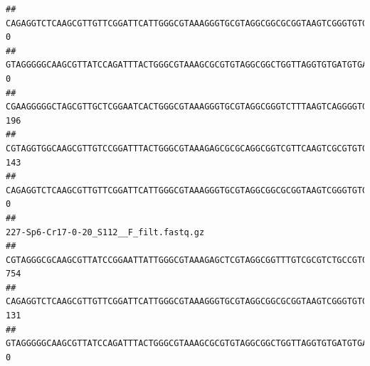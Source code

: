 \documentclass[]{article}
\begin{document}
\begin{verbatim}
## CAGAGGTCTCAAGCGTTGTTCGGATTCATTGGGCGTAAAGGGTGCGTAGGCGGCGCGGTAAGTCGGGTGTGAAATCTCGGAGCTTAACTCCGAAACTGCATTCGATACTGCCGTGCTTGAGGACTGGAGAGGAGACTGGAATTTACGGTGTAGCGGTGAAATGCGTAGATATCGTAAGGAAGACCAGTGGCGAAGGCGGGTCTCTGGACAGTTCCTGACGCTGAGGCACGAAGGCCAGGGGAGCAAACG                                       0
## GTAGGGGGCAAGCGTTATCCAGATTTACTGGGCGTAAAGCGCGTGTAGGCGGCTGGTTAGGTGTGATGTGAAATCTTCCGGCTCAACCGGAAAACTGCATTGCAAACCGGCCTGGCTAGAGTGCAGGAGAGGGAAGCGGAATTCCAGGTGTAGCGGTGAAATGCGTAGATATCTGGAGGAACACCAGTGGCGAAGGCGGCTTCCTGGCCTGCAACTGACGCTGAGACGCGAAAGCGTGGGGAGCGAAC                                        0
## CGAAGGGGGCTAGCGTTGCTCGGAATCACTGGGCGTAAAGGGTGCGTAGGCGGGTCTTTAAGTCAGGGGTGAAATCCTGGAGCTCAACTCCAGAACTGCCTTTGATACTGAAGATCTTGAGTTCGGGAGAGGTGAGTGGAACTGCGAGTGTAGAGGTGAAATTCGTAGATATTCGCAAGAACACCAGTGGCGAAGGCGGCTCACTGGCCCGATACTGACGCTGAGGCACGAAAGCGTGGGGAGCAAACA                                     196
## CGTAGGTGGCAAGCGTTGTCCGGATTTACTGGGCGTAAAGAGCGCGCAGGCGGTCGTTCAAGTCGCGTGTGAAAGCCCCCGGCTCAACTGGGGAGGGTCACGCGATACTGATCGACTCGAAGGCAGGAGAGGGTAGTGGAATTCCCGGTGTAGTGGTGAAATGCGTAGATATCGGGAGGAACACCAGTGGCGAAGGCGACTACCTGGCCTGTTCTTGACGCTGAGGCGCGAAAGCTAGGGGAGCAAACG                                     143
## CAGAGGTCTCAAGCGTTGTTCGGATTCATTGGGCGTAAAGGGTGCGTAGGCGGCGCGGTAAGTCGGGTGTGAAATCTCGGGGCTTAACTCCGAAACTGCATTCGATACTGCCGTGCTTGAGGACTGGAGAGGAGACTGGAATTTACGGTGTAGCGGTGAAATGCGTAGATATCGTAAGGAAGACCAGTGGCGAAGGCGGGTCTCTGGACAGTTCCTGACGCTGAGGCACGAAGGCCAGGGGAGCAAACG                                       0
##                                                                                                                                                                                                                                                           227-Sp6-Cr17-0-20_S112__F_filt.fastq.gz
## CGTAGGGCGCAAGCGTTATCCGGAATTATTGGGCGTAAAGAGCTCGTAGGCGGTTTGTCGCGTCTGCCGTGAAAGTCCGGGGCTCAACTCCGGATCTGCGGTGGGTACGGGCAGACTAGAGTGATGTAGGGGAGACTGGAATTCCTGGTGTAGCGGTGAAATGCGCAGATATCAGGAGGAACACCGATGGCGAAGGCAGGTCTCTGGGCATTAACTGACGCTGAGGAGCGAAAGCATGGGGAGCGAACA                                     754
## CAGAGGTCTCAAGCGTTGTTCGGATTCATTGGGCGTAAAGGGTGCGTAGGCGGCGCGGTAAGTCGGGTGTGAAATCTCGGAGCTTAACTCCGAAACTGCATTCGATACTGCCGTGCTTGAGGACTGGAGAGGAGACTGGAATTTACGGTGTAGCGGTGAAATGCGTAGATATCGTAAGGAAGACCAGTGGCGAAGGCGGGTCTCTGGACAGTTCCTGACGCTGAGGCACGAAGGCCAGGGGAGCAAACG                                     131
## GTAGGGGGCAAGCGTTATCCAGATTTACTGGGCGTAAAGCGCGTGTAGGCGGCTGGTTAGGTGTGATGTGAAATCTTCCGGCTCAACCGGAAAACTGCATTGCAAACCGGCCTGGCTAGAGTGCAGGAGAGGGAAGCGGAATTCCAGGTGTAGCGGTGAAATGCGTAGATATCTGGAGGAACACCAGTGGCGAAGGCGGCTTCCTGGCCTGCAACTGACGCTGAGACGCGAAAGCGTGGGGAGCGAAC                                        0

\end{verbatim}
\end{document}
